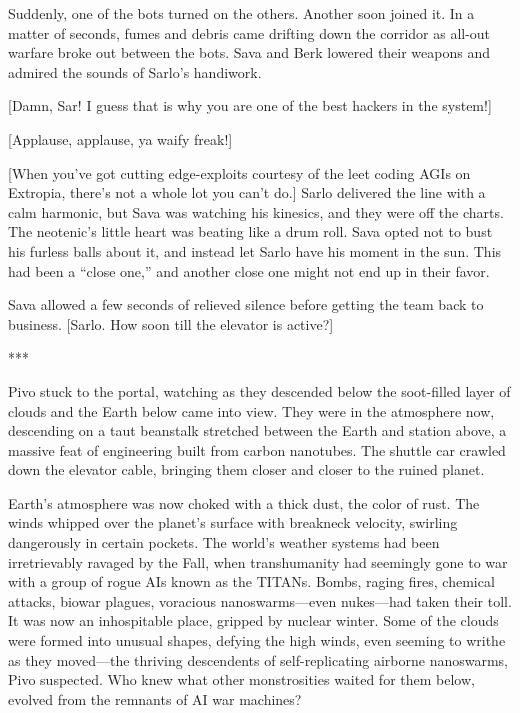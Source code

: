 Suddenly, one of the bots turned on the others. Another soon joined it. In a matter of seconds, fumes and debris came drifting down the corridor as all-out warfare broke out between the bots. Sava and Berk lowered their weapons and admired the sounds of Sarlo's handiwork.

[Damn, Sar! I guess that is why you are one of the best hackers in the system!]

[Applause, applause, ya waify freak!]

[When you've got cutting edge-exploits courtesy of the leet coding AGIs on Extropia, there's not a whole lot you can't do.] Sarlo delivered the line with a calm harmonic, but Sava was watching his kinesics, and they were off the charts. The neotenic's little heart was beating like a drum roll. Sava opted not to bust his furless balls about it, and instead let Sarlo have his moment in the sun. This had been a ``close one,'' and another close one might not end up in their favor.

Sava allowed a few seconds of relieved silence before getting the team back to business. [Sarlo. How soon till the elevator is active?]

\begin{center} *** \end{center}

Pivo stuck to the portal, watching as they descended below the soot-filled layer of clouds and the Earth below came into view. They were in the atmosphere now, descending on a taut beanstalk stretched between the Earth and station above, a massive feat of engineering built from carbon nanotubes. The shuttle car crawled down the elevator cable, bringing them closer and closer to the ruined planet.

Earth's atmosphere was now choked with a thick dust, the color of rust. The winds whipped over the planet's surface with breakneck velocity, swirling dangerously in certain pockets. The world's weather systems had been irretrievably ravaged by the Fall, when transhumanity had seemingly gone to war with a group of rogue AIs known as the TITANs. Bombs, raging fires, chemical attacks, biowar plagues, voracious nanoswarms—even nukes—had taken their toll. It was now an inhospitable place, gripped by nuclear winter. Some of the clouds were formed into unusual shapes, defying the high winds, even seeming to writhe as they moved—the thriving descendents of self-replicating airborne nanoswarms, Pivo suspected. Who knew what other monstrosities waited for them below, evolved from the remnants of AI war machines?

